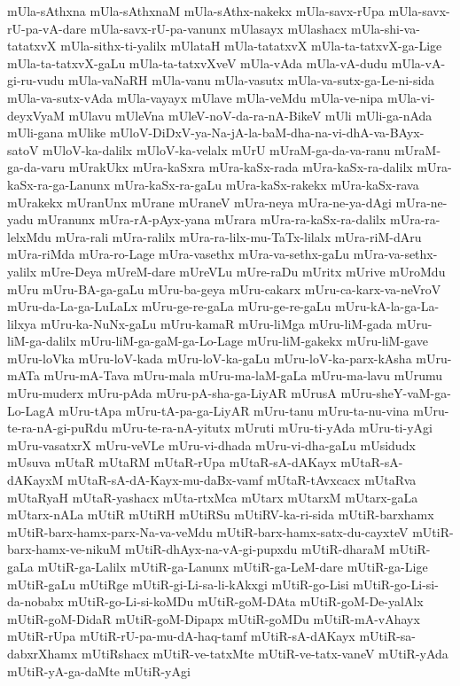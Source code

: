 {mUla-sAthxna
mUla-sAthxnaM
mUla-sAthx-nakekx
mUla-savx-rUpa
mUla-savx-rU-pa-vA-dare
mUla-savx-rU-pa-vanunx
mUlasayx
mUlashacx
mUla-shi-va-tatatxvX
mUla-sithx-ti-yalilx
mUlataH
mUla-tatatxvX
mUla-ta-tatxvX-ga-Lige
mUla-ta-tatxvX-gaLu
mUla-ta-tatxvXveV
mUla-vAda
mUla-vA-dudu
mUla-vA-gi-ru-vudu
mUla-vaNaRH
mUla-vanu
mUla-vasutx
mUla-va-sutx-ga-Le-ni-sida
mUla-va-sutx-vAda
mUla-vayayx
mUlave
mUla-veMdu
mUla-ve-nipa
mUla-vi-deyxVyaM
mUlavu
mUleVna
mUleV-noV-da-ra-nA-BikeV
mUli
mUli-ga-nAda
mUli-gana
mUlike
mUloV-DiDxV-ya-Na-jA-la-baM-dha-na-vi-dhA-va-BAyx-satoV
mUloV-ka-dalilx
mUloV-ka-velalx
mUrU
mUraM-ga-da-va-ranu
mUraM-ga-da-varu
mUrakUkx
mUra-kaSxra
mUra-kaSx-rada
mUra-kaSx-ra-dalilx
mUra-kaSx-ra-ga-Lanunx
mUra-kaSx-ra-gaLu
mUra-kaSx-rakekx
mUra-kaSx-rava
mUrakekx
mUranUnx
mUrane
mUraneV
mUra-neya
mUra-ne-ya-dAgi
mUra-ne-yadu
mUranunx
mUra-rA-pAyx-yana
mUrara
mUra-ra-kaSx-ra-dalilx
mUra-ra-lelxMdu
mUra-rali
mUra-ralilx
mUra-ra-lilx-mu-TaTx-lilalx
mUra-riM-dAru
mUra-riMda
mUra-ro-Lage
mUra-vasethx
mUra-va-sethx-gaLu
mUra-va-sethx-yalilx
mUre-Deya
mUreM-dare
mUreVLu
mUre-raDu
mUritx
mUrive
mUroMdu
mUru
mUru-BA-ga-gaLu
mUru-ba-geya
mUru-cakarx
mUru-ca-karx-va-neVroV
mUru-da-La-ga-LuLaLx
mUru-ge-re-gaLa
mUru-ge-re-gaLu
mUru-kA-la-ga-La-lilxya
mUru-ka-NuNx-gaLu
mUru-kamaR
mUru-liMga
mUru-liM-gada
mUru-liM-ga-dalilx
mUru-liM-ga-gaM-ga-Lo-Lage
mUru-liM-gakekx
mUru-liM-gave
mUru-loVka
mUru-loV-kada
mUru-loV-ka-gaLu
mUru-loV-ka-parx-kAsha
mUru-mATa
mUru-mA-Tava
mUru-mala
mUru-ma-laM-gaLa
mUru-ma-lavu
mUrumu
mUru-muderx
mUru-pAda
mUru-pA-sha-ga-LiyAR
mUrusA
mUru-sheY-vaM-ga-Lo-LagA
mUru-tApa
mUru-tA-pa-ga-LiyAR
mUru-tanu
mUru-ta-nu-vina
mUru-te-ra-nA-gi-puRdu
mUru-te-ra-nA-yitutx
mUruti
mUru-ti-yAda
mUru-ti-yAgi
mUru-vasatxrX
mUru-veVLe
mUru-vi-dhada
mUru-vi-dha-gaLu
mUsidudx
mUsuva
mUtaR
mUtaRM
mUtaR-rUpa
mUtaR-sA-dAKayx
mUtaR-sA-dAKayxM
mUtaR-sA-dA-Kayx-mu-daBx-vamf
mUtaR-tAvxcacx
mUtaRva
mUtaRyaH
mUtaR-yashacx
mUta-rtxMca
mUtarx
mUtarxM
mUtarx-gaLa
mUtarx-nALa
mUtiR
mUtiRH
mUtiRSu
mUtiRV-ka-ri-sida
mUtiR-barxhamx
mUtiR-barx-hamx-parx-Na-va-veMdu
mUtiR-barx-hamx-satx-du-cayxteV
mUtiR-barx-hamx-ve-nikuM
mUtiR-dhAyx-na-vA-gi-pupxdu
mUtiR-dharaM
mUtiR-gaLa
mUtiR-ga-Lalilx
mUtiR-ga-Lanunx
mUtiR-ga-LeM-dare
mUtiR-ga-Lige
mUtiR-gaLu
mUtiRge
mUtiR-gi-Li-sa-li-kAkxgi
mUtiR-go-Lisi
mUtiR-go-Li-si-da-nobabx
mUtiR-go-Li-si-koMDu
mUtiR-goM-DAta
mUtiR-goM-De-yalAlx
mUtiR-goM-DidaR
mUtiR-goM-Dipapx
mUtiR-goMDu
mUtiR-mA-vAhayx
mUtiR-rUpa
mUtiR-rU-pa-mu-dA-haq-tamf
mUtiR-sA-dAKayx
mUtiR-sa-dabxrXhamx
mUtiRshacx
mUtiR-ve-tatxMte
mUtiR-ve-tatx-vaneV
mUtiR-yAda
mUtiR-yA-ga-daMte
mUtiR-yAgi
}
